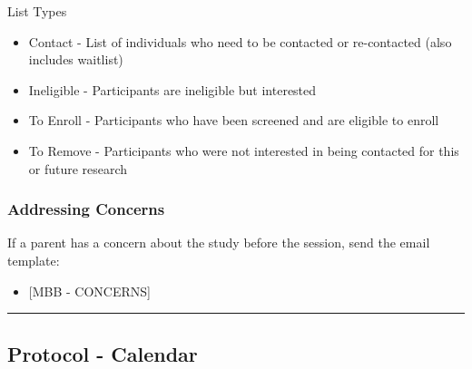 \documentclass[]{book}
\providecommand{\tightlist}{%
  \setlength{\itemsep}{0pt}\setlength{\parskip}{0pt}}
\begin{document}
List Types

\begin{itemize}
\tightlist
\item
  Contact - List of individuals who need to be contacted or re-contacted (also includes waitlist)
\item
  Ineligible - Participants are ineligible but interested
\item
  To Enroll - Participants who have been screened and are eligible to enroll
\item
  To Remove - Participants who were not interested in being contacted for this or future research
\end{itemize}

\hypertarget{addressing-concerns}{%
\subsubsection{Addressing Concerns}\label{addressing-concerns}}

If a parent has a concern about the study before the session, send the email template:

\begin{itemize}
\tightlist
\item
  {[}MBB - CONCERNS{]}
\end{itemize}

\begin{center}\rule{0.5\linewidth}{0.5pt}\end{center}

\hypertarget{protocol---calendar}{%
\subsection{Protocol - Calendar}\label{protocol---calendar}}
\end{document}
